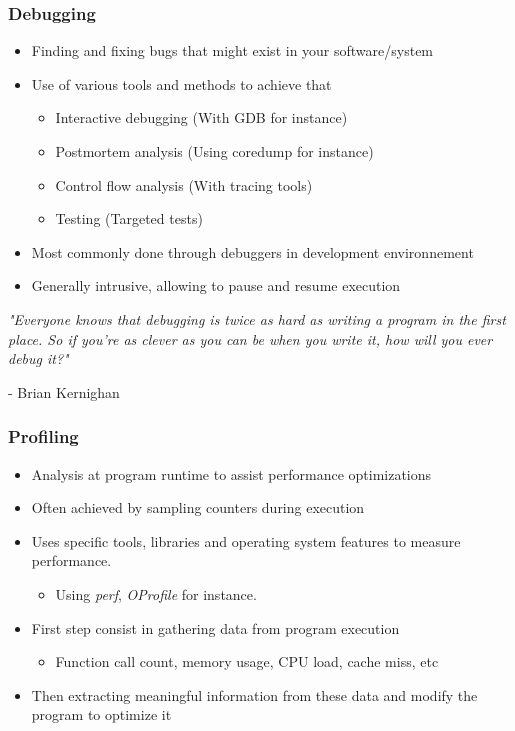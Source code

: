 \begin{frame}
  \frametitle{Debugging}
  \begin{itemize}
    \item Finding and fixing bugs that might exist in your software/system
    \item Use of various tools and methods to achieve that
    \begin{itemize}
      \item Interactive debugging (With GDB for instance)
      \item Postmortem analysis (Using coredump for instance)
      \item Control flow analysis (With tracing tools)
      \item Testing (Targeted tests)
    \end{itemize}
    \item Most commonly done through debuggers in development environnement
    \item Generally intrusive, allowing to pause and resume execution
  \end{itemize}
  \vspace{0.5cm}

  {\small \em "Everyone knows that debugging is twice as hard as writing a program in the first place. So if you're as
    clever as you can be when you write it, how will you ever debug it?" 

  - Brian Kernighan }

\end{frame}

\begin{frame}
  \frametitle{Profiling}
  \begin{itemize}
    \item Analysis at program runtime to assist performance optimizations
    \item Often achieved by sampling counters during execution
    \item Uses specific tools, libraries and operating system features to
          measure performance.
    \begin{itemize}
      \item Using {\em perf}, {\em OProfile} for instance.
    \end{itemize}
    \item First step consist in gathering data from program execution
    \begin{itemize}
      \item Function call count, memory usage, CPU load, cache miss, etc
    \end{itemize}
    \item Then extracting meaningful information from these data and modify the
          program to optimize it
\end{itemize}
\end{frame}


